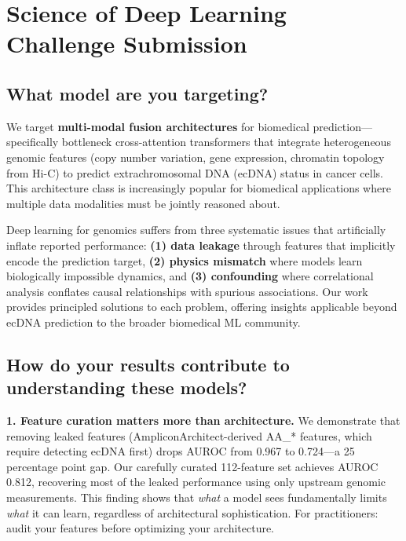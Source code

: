 \documentclass{article}
\begin{document}
\newpage
\section*{Science of Deep Learning Challenge Submission}

\subsection*{What model are you targeting?}

We target \textbf{multi-modal fusion architectures} for biomedical prediction---specifically bottleneck cross-attention transformers that integrate heterogeneous genomic features (copy number variation, gene expression, chromatin topology from Hi-C) to predict extrachromosomal DNA (ecDNA) status in cancer cells. This architecture class is increasingly popular for biomedical applications where multiple data modalities must be jointly reasoned about.

Deep learning for genomics suffers from three systematic issues that artificially inflate reported performance: \textbf{(1) data leakage} through features that implicitly encode the prediction target, \textbf{(2) physics mismatch} where models learn biologically impossible dynamics, and \textbf{(3) confounding} where correlational analysis conflates causal relationships with spurious associations. Our work provides principled solutions to each problem, offering insights applicable beyond ecDNA prediction to the broader biomedical ML community.

\subsection*{How do your results contribute to understanding these models?}

\textbf{1. Feature curation matters more than architecture.} We demonstrate that removing leaked features (AmpliconArchitect-derived AA\_* features, which require detecting ecDNA first) drops AUROC from 0.967 to 0.724---a 25 percentage point gap. Our carefully curated 112-feature set achieves AUROC 0.812, recovering most of the leaked performance using only upstream genomic measurements. This finding shows that \textit{what} a model sees fundamentally limits \textit{what} it can learn, regardless of architectural sophistication. For practitioners: audit your features before optimizing your architecture.
\end{document}
